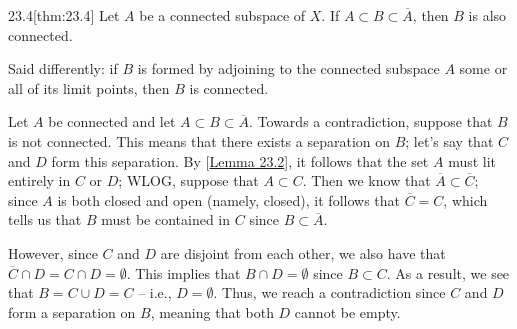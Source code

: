\begin{thmBox}{23.4}[thm:23.4]
    Let \( A \) be a connected subspace of \( X \).
    If \( A \subset B \subset \overline{ A } \), then \( B \) is also 
    connected.

    \baseSkip 

    Said differently: if \( B \) is formed by adjoining to the connected 
    subspace \( A \) some or all of its limit points, then \( B \) is 
    connected.

    \baseRule

    \begin{proofBox}
        Let \( A \) be connected and let 
        \( A \subset B \subset \overline{ A } \).
        Towards a contradiction, suppose that \( B \) is not connected.
        This means that there exists a separation on \( B \); let's say that 
        \( C \) and \( D \) form this separation.
        By [\hyperlink{lem:23.2}{Lemma 23.2}], it follows that the set \( A \) 
        must lit entirely in \( C \) or \( D \);
        WLOG, suppose that \( A \subset C \).
        Then we know that \( \overline{ A } \subset \overline{ C } \); since 
        \( A \) is both closed and open (namely, closed), it follows that 
        \( \overline{ C } = C \), which tells us that \( B \) must be contained 
        in \( C \) since \( B \subset \overline{ A } \).

        \baseSkip

        However, since \( C \) and \( D \) are disjoint from each other, we also
        have that \( \overline{ C } \cap D = C \cap D = \emptyset \).
        This implies that \( B \cap D = \emptyset \) since \( B \subset C \).
        As a result, we see that \( B = C \cup D = C \) -- i.e., 
        \( D = \emptyset \).
        Thus, we reach a contradiction since \( C \) and \( D \) form a 
        separation on \( B \), meaning that both \( D \) cannot be empty.
    \end{proofBox}
\end{thmBox}

